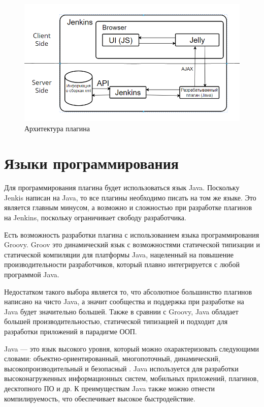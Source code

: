 \begin{figure}[ht!] 
	\center
	\includegraphics [scale=0.67] {my_folder/images//archpl2}
	\caption{Архитектура плагина} 
	\label{fig:ArchitectureJenkins}  
\end{figure}


\section{Языки программирования} \label{ch1:sec4}

Для программирования плагина будет использоваться язык Java. Поскольку Jenkis написан на Java, то все плагины необходимо писать на том же языке. Это является главным минусом, а возможно и сложностью при разработке плагинов на Jenkins, поскольку ограничивает свободу разработчика.

Есть возможность разработки плагина с использованием языка программирования Groovy. Groov это динамический язык с возможностями статической типизации и статической компиляции для платформы Java\cite{groovy}, нацеленный на повышение производительности разработчиков, который плавно интегрируется с любой программой Java.

Недостатком такого выбора является то, что абсолютное большинство плагинов написано на чисто Java, а значит сообщества и поддержка при разработке на Java будет значительно большей. Также в сравнии с Groovy, Java обладает большей производительностью\cite{groovyvsjava}, статической типизацией и подходит для разработки приложений в парадигме ООП.

Java — это язык высокого уровня, который можно охарактеризовать следующими словами: объектно-ориентированный, многопоточный, динамический, высокопроизводительный и безопасный \cite{java}. Java используется для разработки высоконагруженных информационных систем, мобильных приложений, плагинов, десктопного ПО и др. К преимуществам Java также можно отнести компилируемость, что обеспечивает высокое быстродействие.

